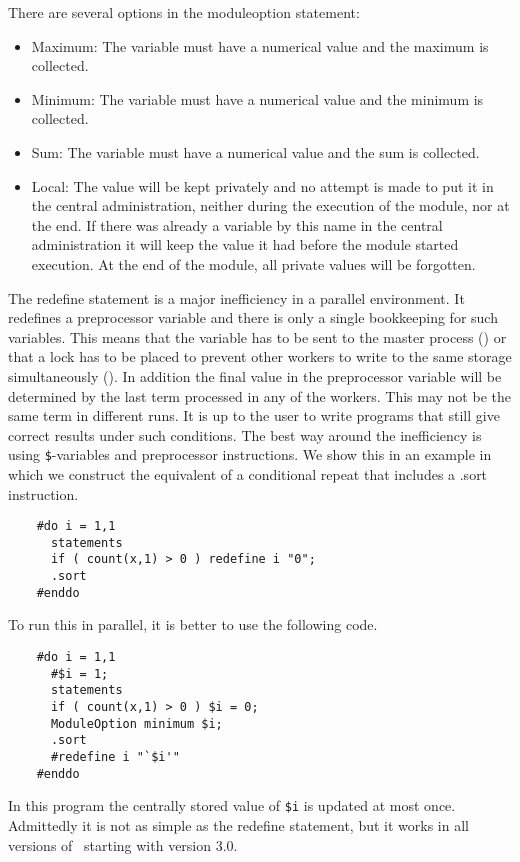 There are several options in the moduleoption statement:
\begin{itemize}
\item Maximum: The variable must have a 
numerical value and the maximum is collected.
\item Minimum: The variable must have a 
numerical value and the minimum is collected.
\item Sum: The variable must have a numerical value 
and the sum is collected.
\item Local: The value will be kept privately and 
no attempt is made to put it in the central administration, neither during 
the execution of the module, nor at the end. If there was already a 
variable by this name in the central administration it will keep the value 
it had before the module started execution. At the end of the module, all 
private values will be forgotten.
\end{itemize}

The redefine statement is a major inefficiency in a parallel environment. 
It redefines a preprocessor variable and there is only a single bookkeeping 
for such variables. This means that the variable has to be sent to the 
master process (\ParFORM) or that a lock has to be placed to prevent other 
workers to write to the same storage simultaneously (\TFORM). In addition 
the final value in the preprocessor variable will be determined by the last 
term processed in any of the workers. This may not be the same term in 
different runs. It is up to the user to write programs that still give 
correct results under such conditions. The best way around the inefficiency 
is using \verb:$:-variables and preprocessor instructions. We show this in 
an example in which we construct the equivalent of a conditional repeat 
that includes a .sort instruction.
\begin{verbatim}
    #do i = 1,1
      statements
      if ( count(x,1) > 0 ) redefine i "0";
      .sort
    #enddo
\end{verbatim}
To run this in parallel, it is better to use the following code.
\begin{verbatim}
    #do i = 1,1
      #$i = 1;
      statements
      if ( count(x,1) > 0 ) $i = 0;
      ModuleOption minimum $i;
      .sort
      #redefine i "`$i'"
    #enddo
\end{verbatim}
In this program the centrally stored value of \verb:$i: is updated at most 
once. Admittedly it is not as simple as the redefine statement, but it 
works in all versions of \FORM\ starting with version 3.0.

